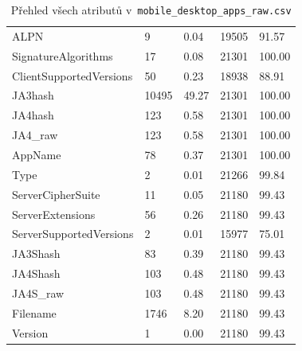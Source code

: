 \begin{table}[h!]
\begin{tabular}{lllll}
		ALPN                    & 9                                   & 0.04             & 19505                    & 91.57            \\
		SignatureAlgorithms     & 17                                  & 0.08             & 21301                    & 100.00           \\
		ClientSupportedVersions & 50                                  & 0.23             & 18938                    & 88.91            \\
		JA3hash                 & 10495                               & 49.27            & 21301                    & 100.00           \\
		JA4hash                 & 123                                 & 0.58             & 21301                    & 100.00           \\
		JA4\_raw                & 123                                 & 0.58             & 21301                    & 100.00           \\
		AppName                 & 78                                  & 0.37             & 21301                    & 100.00           \\
		Type                    & 2                                   & 0.01             & 21266                    & 99.84            \\
		ServerCipherSuite       & 11                                  & 0.05             & 21180                    & 99.43            \\
		ServerExtensions        & 56                                  & 0.26             & 21180                    & 99.43            \\
		ServerSupportedVersions & 2                                   & 0.01             & 15977                    & 75.01            \\
		JA3Shash                & 83                                  & 0.39             & 21180                    & 99.43            \\
		JA4Shash                & 103                                 & 0.48             & 21180                    & 99.43            \\
		JA4S\_raw               & 103                                 & 0.48             & 21180                    & 99.43            \\
		Filename                & 1746                                & 8.20             & 21180                    & 99.43            \\
		Version                 & 1                                   & 0.00             & 21180                    & 99.43            \\
		\bottomrule
	\end{tabular}
	\caption{Přehled všech atributů v~\texttt{mobile\_desktop\_apps\_raw.csv}}
	\label{tab:mobile-appendix}
\end{table}

